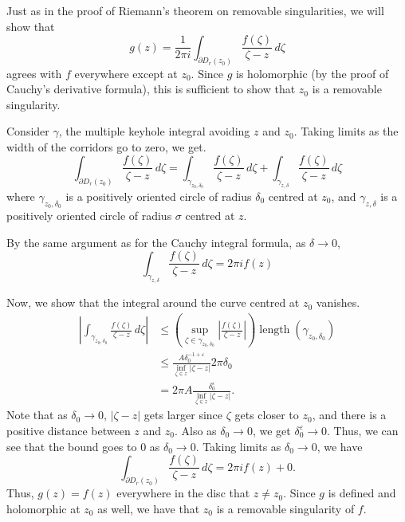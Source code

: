 \documentclass[12 pt, letterpaper]{hmcpset}
\begin{document}
\begin{solution} 
	Just as in the proof of Riemann's theorem on removable singularities, we will show that
	\[
		g(z) = \frac{1}{2 \pi i} \int_{\partial D_{r}(z_{0})} \frac{f(\zeta)}{\zeta - z} \, d\zeta 
	\]
	agrees with $f$ everywhere except at $z_{0}$. Since $g$ is holomorphic (by the proof of Cauchy's derivative formula), this is sufficient to show that $z_{0}$ is a removable singularity.

	Consider $\gamma$, the multiple keyhole integral avoiding $z$ and $z_{0}$. Taking limits as the width of the corridors go to zero, we get.
	\[
		\int_{\partial D_{r}(z_{0})} \frac{f(\zeta)}{\zeta - z} \, d \zeta = \int_{\gamma_{z_{0}, \delta_{0}}} \frac{f(\zeta)}{\zeta - z} \, d \zeta + \int_{\gamma_{z, \delta}} \frac{f(\zeta)}{\zeta - z} \, d \zeta 
	\]
	where $\gamma_{z_{0}, \delta_{0}}$ is a positively oriented circle of radius $\delta_{0}$ centred at $z_{0}$, and  $\gamma_{z, \delta}$ is a positively oriented circle of radius $\sigma$ centred at $z$.

	By the same argument as for the Cauchy integral formula, as $\delta \to 0$,
	\[
		\int_{\gamma_{z, \delta}} \frac{f(\zeta)}{\zeta - z} \, d\zeta = 2 \pi i f(z)
	\]

	Now, we show that the integral around the curve centred at $z_{0}$ vanishes.
	\[
		\begin{split}
			\left \lvert \int_{\gamma_{z_{0}, \delta_{0}}} \frac{f(\zeta)}{\zeta - z} \, d \zeta \right \rvert & \le \left ( \sup_{\zeta \in \gamma_{z_{0}, \delta_{0}}} \left \lvert \frac{f(\zeta)}{\zeta - z} \right \rvert \right ) \operatorname{length}(\gamma_{z_{0}, \delta_{0}}) \\
															   & \le \frac{A \delta_{0}^{-1 + \varepsilon}}{\inf_{\zeta \in z} \lvert \zeta - z \rvert} 2 \pi \delta_{0} \\
															   & = 2 \pi A \frac{\delta_{0}^{\varepsilon}}{\inf_{\zeta \in z} \lvert \zeta - z \rvert}.
		\end{split}
	\]
	Note that as $\delta_{0} \to 0$, $\lvert \zeta - z \rvert$ gets larger since $\zeta$ gets closer to $z_{0}$, and there is a positive distance between $z$ and $z_{0}$. Also as $\delta_{0} \to 0$, we get $\delta_{0}^{\varepsilon} \to 0$. Thus, we can see that the bound goes to $0$ as $\delta_{0} \to 0$. Taking limits as $\delta_{0} \to 0$, we have
	\[
		\int_{\partial D_{r}(z_{0})} \frac{f(\zeta)}{\zeta - z} \, d \zeta = 2 \pi i f(z) + 0.
	\]
	Thus, $g(z) = f(z)$ everywhere in the disc that $z \neq z_{0}$. Since $g$ is defined and holomorphic at $z_{0}$ as well, we have that $z_{0}$ is a removable singularity of $f$.
\end{solution}
\end{document}
